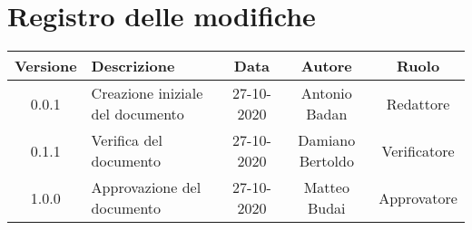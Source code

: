 \section*{Registro delle modifiche}

\begin{center}
	\begin{longtable}{|c|p{5cm}|c|c|c|}
	\hline
	\rowcolor{lighter-grayer}
	\textbf{Versione} & \textbf{Descrizione} & \textbf{Data} & \textbf{Autore} & \textbf{Ruolo} \\
	\hline
	\endfirsthead


	\hline
	0.0.1 & Creazione iniziale del documento & 27-10-2020 & Antonio Badan & Redattore \\
	\hline
	0.1.1 & Verifica del documento & 27-10-2020 & Damiano Bertoldo & Verificatore \\
	\hline
	1.0.0 & Approvazione del documento & 27-10-2020 & Matteo Budai & Approvatore \\
	\hline

	\end{longtable}
\end{center}